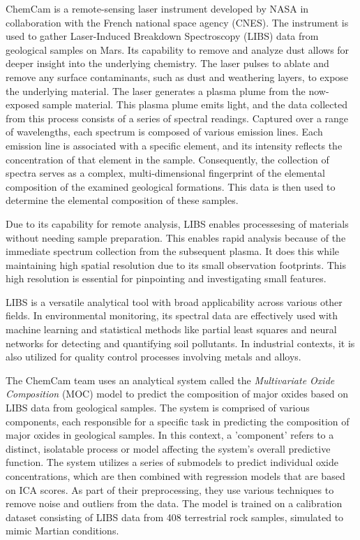 ChemCam is a remote-sensing laser instrument developed by NASA in collaboration with the French national space agency (CNES).
The instrument is used to gather Laser-Induced Breakdown Spectroscopy (LIBS) data from geological samples on Mars.
Its capability to remove and analyze dust allows for deeper insight into the underlying chemistry.
The laser pulses to ablate and remove any surface contaminants, such as dust and weathering layers, to expose the underlying material.
The laser generates a plasma plume from the now-exposed sample material.
This plasma plume emits light, and the data collected from this process consists of a series of spectral readings.
Captured over a range of wavelengths, each spectrum is composed of various emission lines.
Each emission line is associated with a specific element, and its intensity reflects the concentration of that element in the sample.
Consequently, the collection of spectra serves as a complex, multi-dimensional fingerprint of the elemental composition of the examined geological formations.
This data is then used to determine the elemental composition of these samples.\cite{cleggRecalibrationMarsScience2017}

Due to its capability for remote analysis, LIBS enables processesing of materials without needing sample preparation. This enables rapid analysis because of the immediate spectrum collection from the subsequent plasma. It does this while maintaining high spatial resolution due to its small observation footprints. This high resolution is essential for pinpointing and investigating small features. \cite{wiensChemcam2012}

LIBS is a versatile analytical tool with broad applicability across various other fields. In environmental monitoring, its spectral data are effectively used with machine learning and statistical methods like partial least squares and neural networks for detecting and quantifying soil pollutants. In industrial contexts, it is also utilized for quality control processes involving metals and alloys\cite{huang_progress_2023}.

The ChemCam team uses an analytical system called the \textit{Multivariate Oxide Composition} (MOC) model to predict the composition of major oxides based on LIBS data from geological samples.
The system is comprised of various components, each responsible for a specific task in predicting the composition of major oxides in geological samples.
In this context, a 'component' refers to a distinct, isolatable process or model affecting the system's overall predictive function.
The system utilizes a series of submodels to predict individual oxide concentrations, which are then combined with regression models that are based on ICA scores.
As part of their preprocessing, they use various techniques to remove noise and outliers from the data.\cite{cleggRecalibrationMarsScience2017}
The model is trained on a calibration dataset consisting of LIBS data from 408 terrestrial rock samples, simulated to mimic Martian conditions\cite{cleggRecalibrationMarsScience2017}.

